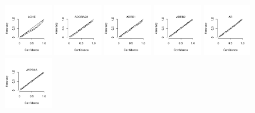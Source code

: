 \documentclass[10pt,article]{memoir}
\begin{document}
\begin{figure}[h!]
    \vspace*{-15pt} %
    \includegraphics[width=0.19\textwidth]{figures/calibration_plots/ache_calib.pdf}
    \includegraphics[width=0.19\textwidth]{figures/calibration_plots/adora2a_calib.pdf}
    \includegraphics[width=0.19\textwidth]{figures/calibration_plots/adrb1_calib.pdf}
    \includegraphics[width=0.19\textwidth]{figures/calibration_plots/adrb2_calib.pdf}
    \includegraphics[width=0.19\textwidth]{figures/calibration_plots/ar_calib.pdf}
    \vspace*{-15pt} %
    \includegraphics[width=0.19\textwidth]{figures/calibration_plots/avpr1a_calib.pdf}

\end{figure}
\end{document}
